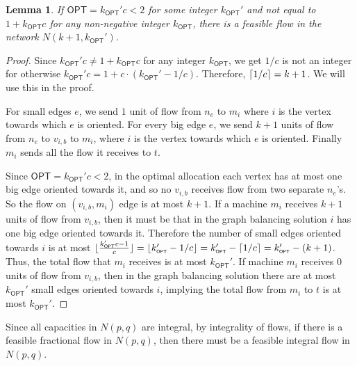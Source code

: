 \documentclass[11pt]{article}
\newcommand{\OPT}{\mathsf{OPT}}
\newcommand{\kk}{k_{\scriptscriptstyle \OPT}}
\newcommand{\kkkk}{k_{\scriptscriptstyle \OPT}'}
\DeclarePairedDelimiter\floor{\lfloor}{\rfloor}
\DeclarePairedDelimiter\ceil{\lceil}{\rceil}
\newtheorem{lemma}{Lemma}
\begin{document}
\begin{lemma}\label{lem:22}
If $\OPT = \kkkk c < 2$ for some integer $\kkkk$ and not equal to $1+\kk c$ for any non-negative integer $\kk$, there is a feasible flow in the network $N(k+1,\kkkk)$. \end{lemma}
\begin{proof}
	Since $\kkkk c \neq 1 + \kk c$ for any integer $\kk$, we get $1/c$ is not an integer for otherwise $\kkkk c = 1 + c\cdot\left( \kkkk - 1/c\right)$. Therefore, $\ceil{1/c} = k+1$.
	We will use this in the proof.
	
	For small edges $e$, we send $1$ unit of flow from $n_e$ to $m_i$ where $i$ is the vertex towards which $e$ is oriented. 
	For every big edge $e$, we send $k+1$ units of flow from $n_e$ to $v_{i,b}$ to $m_i$, where $i$ is the vertex towards which $e$ is oriented. 
	Finally $m_i$ sends all the flow it receives to $t$.
	
	Since $\OPT = \kkkk c < 2$, in the optimal allocation each vertex has at most one big edge oriented towards it, and so no $v_{i,b}$ receives flow from two separate $n_e$'s. So the flow on $(v_{i,b},m_i)$ edge is at most $k+1$. If a machine $m_i$ receives $k+1$ units of flow from $v_{i,b}$, then it must be that in the graph balancing solution $i$ has one big edge oriented towards it.
	Therefore the number of small edges oriented towards $i$ is at most  $\floor{\frac{\kkkk c - 1}{c}} = \floor{\kkkk - 1/c} = \kkkk - \ceil{1/c} = \kkkk - (k+1)$.
		 Thus, the total flow that $m_i$ receives is at most $\kkkk$. If machine $m_i$ receives $0$ units of flow from $v_{i,b}$, then in the graph balancing solution there are at most $\kkkk$ small edges oriented towards $i$, implying the total flow from $m_i$ to $t$ is at most $\kkkk$.
\end{proof}
\noindent
Since all capacities in $N(p,q)$ are integral, by integrality of flows,  if there is a feasible fractional flow in $N(p,q)$, then there must be a feasible integral flow in $N(p,q)$.
\end{document}
